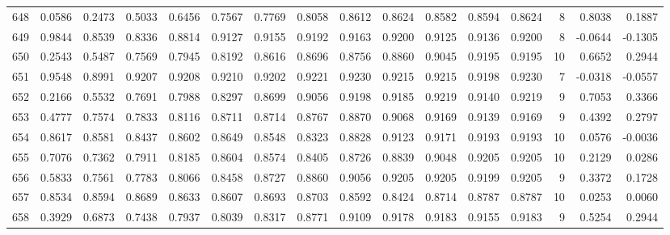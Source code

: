\begin{tabular}{lrrrrrrrrrrrrrrr}
648 &      0.0586 &  0.2473 &  0.5033 &  0.6456 &  0.7567 &  0.7769 &  0.8058 &  0.8612 &  0.8624 &  0.8582 &   0.8594 &     0.8624 &      8 &                    0.8038 &                     0.1887 \\
649 &      0.9844 &  0.8539 &  0.8336 &  0.8814 &  0.9127 &  0.9155 &  0.9192 &  0.9163 &  0.9200 &  0.9125 &   0.9136 &     0.9200 &      8 &                   -0.0644 &                    -0.1305 \\
650 &      0.2543 &  0.5487 &  0.7569 &  0.7945 &  0.8192 &  0.8616 &  0.8696 &  0.8756 &  0.8860 &  0.9045 &   0.9195 &     0.9195 &     10 &                    0.6652 &                     0.2944 \\
651 &      0.9548 &  0.8991 &  0.9207 &  0.9208 &  0.9210 &  0.9202 &  0.9221 &  0.9230 &  0.9215 &  0.9215 &   0.9198 &     0.9230 &      7 &                   -0.0318 &                    -0.0557 \\
652 &      0.2166 &  0.5532 &  0.7691 &  0.7988 &  0.8297 &  0.8699 &  0.9056 &  0.9198 &  0.9185 &  0.9219 &   0.9140 &     0.9219 &      9 &                    0.7053 &                     0.3366 \\
653 &      0.4777 &  0.7574 &  0.7833 &  0.8116 &  0.8711 &  0.8714 &  0.8767 &  0.8870 &  0.9068 &  0.9169 &   0.9139 &     0.9169 &      9 &                    0.4392 &                     0.2797 \\
654 &      0.8617 &  0.8581 &  0.8437 &  0.8602 &  0.8649 &  0.8548 &  0.8323 &  0.8828 &  0.9123 &  0.9171 &   0.9193 &     0.9193 &     10 &                    0.0576 &                    -0.0036 \\
655 &      0.7076 &  0.7362 &  0.7911 &  0.8185 &  0.8604 &  0.8574 &  0.8405 &  0.8726 &  0.8839 &  0.9048 &   0.9205 &     0.9205 &     10 &                    0.2129 &                     0.0286 \\
656 &      0.5833 &  0.7561 &  0.7783 &  0.8066 &  0.8458 &  0.8727 &  0.8860 &  0.9056 &  0.9205 &  0.9205 &   0.9199 &     0.9205 &      9 &                    0.3372 &                     0.1728 \\
657 &      0.8534 &  0.8594 &  0.8689 &  0.8633 &  0.8607 &  0.8693 &  0.8703 &  0.8592 &  0.8424 &  0.8714 &   0.8787 &     0.8787 &     10 &                    0.0253 &                     0.0060 \\
658 &      0.3929 &  0.6873 &  0.7438 &  0.7937 &  0.8039 &  0.8317 &  0.8771 &  0.9109 &  0.9178 &  0.9183 &   0.9155 &     0.9183 &      9 &                    0.5254 &                     0.2944 \\

\end{tabular}
